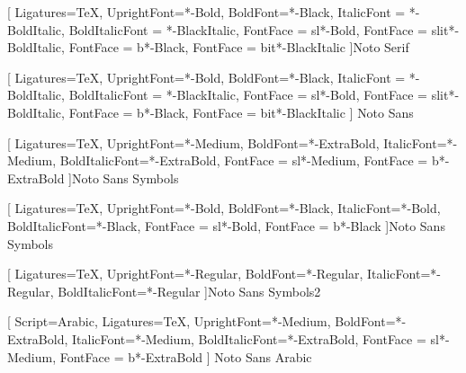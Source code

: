 \newfontfamily{\ulSerifHeavyFont}[ %
  Ligatures=TeX,
  UprightFont=*-Bold,
  BoldFont=*-Black,
  ItalicFont = *-BoldItalic,
  BoldItalicFont = *-BlackItalic,
  FontFace = {sl}{\shapedefault}{*-Bold},
  FontFace = {sl}{it}{*-BoldItalic},
  FontFace = {b}{\shapedefault}{*-Black},
  FontFace = {b}{it}{*-BlackItalic}
]{Noto Serif}

\newfontfamily{\ulSansHeavyFont}[ %
  Ligatures=TeX,
  UprightFont=*-Bold,
  BoldFont=*-Black,
  ItalicFont = *-BoldItalic,
  BoldItalicFont = *-BlackItalic,
  FontFace = {sl}{\shapedefault}{*-Bold},
  FontFace = {sl}{it}{*-BoldItalic},
  FontFace = {b}{\shapedefault}{*-Black},
  FontFace = {b}{it}{*-BlackItalic}
] {Noto Sans}

\newfontfamily{\ulSymbolFont}[ %
  Ligatures=TeX,
  UprightFont=*-Medium,
  BoldFont=*-ExtraBold,
  ItalicFont=*-Medium,
  BoldItalicFont=*-ExtraBold,
  FontFace = {sl}{\shapedefault}{*-Medium},
  FontFace = {b}{\shapedefault}{*-ExtraBold}
]{Noto Sans Symbols}

\newfontfamily{\ulSymbolHeavyFont}[ %
  Ligatures=TeX,
  UprightFont=*-Bold,
  BoldFont=*-Black,
  ItalicFont=*-Bold,
  BoldItalicFont=*-Black,
  FontFace = {sl}{\shapedefault}{*-Bold},
  FontFace = {b}{\shapedefault}{*-Black}
]{Noto Sans Symbols}

\newfontfamily{\ulSymbolTwoFont}[ %
  Ligatures=TeX,
  UprightFont=*-Regular,
  BoldFont=*-Regular,
  ItalicFont=*-Regular,
  BoldItalicFont=*-Regular
]{Noto Sans Symbols2} %

\newfontfamily{\persianfont}[ %
  Script=Arabic,
  Ligatures=TeX,
  UprightFont=*-Medium,
  BoldFont=*-ExtraBold,
  ItalicFont=*-Medium,
  BoldItalicFont=*-ExtraBold,
  FontFace = {sl}{\shapedefault}{*-Medium},
  FontFace = {b}{\shapedefault}{*-ExtraBold}
] {Noto Sans Arabic}
\let\persianfontsf\persianfont %
\let\persianfonttt\persianfont %

\renewcommand{\rmdefault}{ulnotoserif}

\renewcommand{\sfdefault}{ulnotosans}

\renewcommand{\ttdefault}{ulnotomono}

